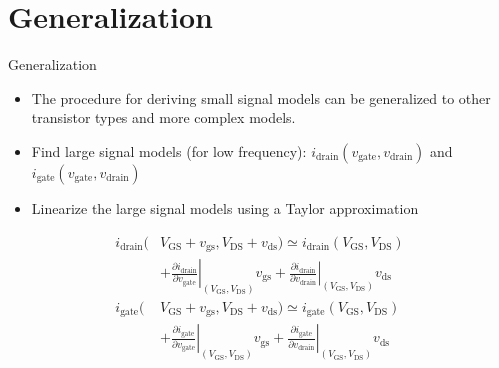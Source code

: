 \section{Generalization}
\begin{frame}{Generalization}
    \begin{itemize}
        \item The procedure for deriving small signal models can be generalized to other 
        transistor types and more complex models.
        \item Find large signal models (for low frequency): 
        $i_{\mathrm{drain}}(v_{\mathrm{gate}}, v_{\mathrm{drain}})$ and 
        $i_{\mathrm{gate}}(v_{\mathrm{gate}}, v_{\mathrm{drain}})$
        \item Linearize the large signal models using a Taylor approximation
    \end{itemize}
    \begin{align*}
        i_{\mathrm{drain}}(&V_{\mathrm{GS}}+v_{\mathrm{gs}},
        V_{\mathrm{DS}}+v_{\mathrm{ds}})\simeq i_{\mathrm{drain}}
        (V_{\mathrm{GS}},V_{\mathrm{DS}}) \\
        &+\left.\frac{\partial i_{\mathrm{drain}}}{\partial v_{\mathrm{gate}}}\right|
        _{(V_{\mathrm{GS}},V_{\mathrm{DS}})} v_{\mathrm{gs}} 
        + \left. \frac{\partial i_{\mathrm{drain}}}{\partial v_{\mathrm{drain}}} \right|
        _{(V_{\mathrm{GS}},V_{\mathrm{DS}})} v_{\mathrm{ds}} \\
        i_\mathrm{gate}(&V_{\mathrm{GS}}+v_{\mathrm{gs}},
        V_{\mathrm{DS}}+v_{\mathrm{ds}})\simeq i_{\mathrm{gate}}
        (V_{\mathrm{GS}},V_{\mathrm{DS}}) \\
        &+\left.\frac{\partial i_\mathrm{gate}}{\partial v_{\mathrm{gate}}}\right|
        _{(V_{\mathrm{GS}},V_{\mathrm{DS}})} v_{\mathrm{gs}} 
        + \left. \frac{\partial i_\mathrm{gate}}{\partial v_{\mathrm{drain}}} \right|
        _{(V_{\mathrm{GS}},V_{\mathrm{DS}})} v_{\mathrm{ds}}
    \end{align*}
\end{frame}

